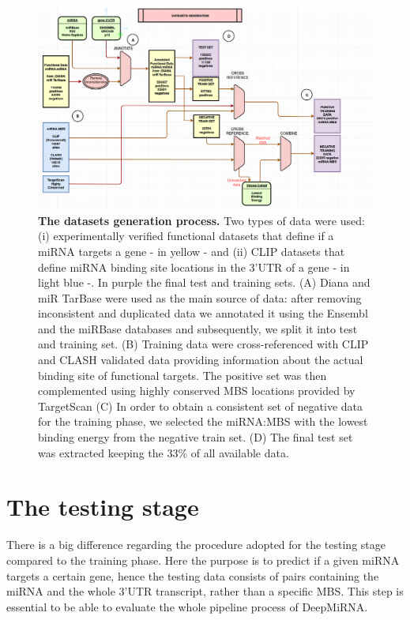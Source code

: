 \begin{figure}[hbt!]
	\centering
	\includegraphics[width=1\textwidth]{Figures/training}
	\caption{\textbf{The datasets generation process.} Two types of data were used: (i) experimentally verified functional datasets that define if a miRNA targets a gene - in yellow - and (ii) CLIP datasets that define miRNA binding site locations in the 3'UTR of a gene - in light blue -. In purple the final test and training sets. (A) Diana and miR TarBase were used as the main source of data: after removing inconsistent and duplicated data we annotated it using the Ensembl and the miRBase databases and subsequently, we split it into test and training set. (B) Training data were cross-referenced with CLIP and CLASH validated data providing information about the actual binding site of functional targets. The positive set was then complemented using highly conserved MBS locations provided by TargetScan (C) In order to obtain a consistent set of negative data for the training phase, we selected the miRNA:MBS with the lowest binding energy from the negative train set. (D) The final test set was extracted keeping the 33\% of all available data.}
	\label{fig:training}
\end{figure}

\section{The testing stage}
There is a big difference regarding the procedure adopted for the testing stage compared to the training phase. Here the purpose is to predict if a given miRNA targets a certain gene, hence the testing data consists of pairs containing the miRNA and the whole 3'UTR transcript, rather than a specific MBS. This step is essential to be able to evaluate the whole pipeline process of DeepMiRNA.

